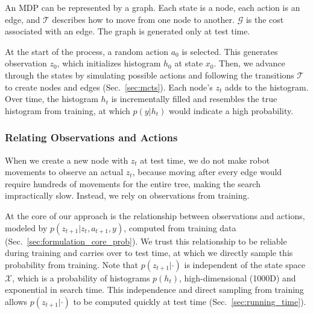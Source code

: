 \documentclass[letterpaper, 10 pt, conference]{ieeeconf}  %
\begin{document}
An MDP can be represented by a graph. Each state is a node, each action is an edge, and %
$\mathcal{T}$ describes how to move from one node to another. %
$\mathcal{G}$ is the cost associated with an edge.
The graph is generated only at test time.

At the start of the process, a random action $a_0$ is selected. This generates observation $z_0$, which initializes histogram $h_0$ at state $x_0$.
Then, we advance through the states by simulating possible actions and following the transitions $\mathcal{T}$ to create nodes and edges (Sec.~\ref{sec:mcts}).
Each node's $z_t$ adds to the histogram.
Over time, the histogram $h_t$ is incrementally filled and resembles the true histogram from training, at which $p(y|h_t)$ would indicate a high probability.


\subsubsection{Relating Observations and Actions}

When we create a new node with $z_t$ at test time, we do not make robot movements to observe an actual $z_t$, because moving after every edge would require hundreds of movements for the entire tree, making the search impractically slow.
Instead, we rely on observations from training.

At the core of our approach is the relationship between observations and actions, modeled by $p(z_{t+1} | z_t, a_{t+1}, y)$, computed from training data (Sec.~\ref{sec:formulation_core_prob}). We trust this relationship to be reliable during training and carries over to test time, at which we directly sample this probability from training.
%
Note that $p(z_{t+1} | \cdot)$ is independent of the state space $\mathcal{X}$, which is a probability of histograms $p(h_t)$, high-dimensional (1000D) and exponential in search time.
This independence and direct sampling from training 
allows $p(z_{t+1} | \cdot)$ to be computed quickly at test time (Sec.~\ref{sec:running_time}).


\end{document}
